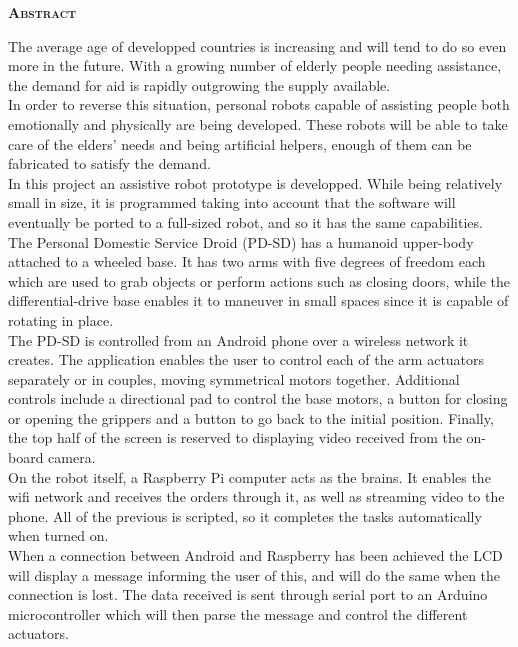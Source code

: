 
\vspace*{2cm}
\begin{center}
\color{part} \textsc{\huge \textbf{Abstract}}\\[1cm]
\end{center}

The average age of developped countries is increasing and will tend to do so even more in the future. With a growing number of elderly people needing assistance, the demand for aid is rapidly outgrowing the supply available.\\

In order to reverse this situation, personal robots capable of assisting people both emotionally and physically are being developed. These robots will be able to take care of the elders' needs and being artificial helpers, enough of them can be fabricated to satisfy the demand.\\

In this project an assistive robot prototype is developped. While being relatively small in size, it is programmed taking into account that the software will eventually be ported to a full-sized robot, and so it has the same capabilities.\\

The Personal Domestic Service Droid (PD-SD) has a humanoid upper-body attached to a wheeled base. It has two arms with five degrees of freedom each which are used to grab objects or perform actions such as closing doors, while the differential-drive base enables it to maneuver in small spaces since it is capable of rotating in place.\\

The PD-SD is controlled from an Android phone over a wireless network it creates. The application enables the user to control each of the arm actuators separately or in couples, moving symmetrical motors together. Additional controls include a directional pad to control the base motors, a button for closing or opening the grippers and a button to go back to the initial position. Finally, the top half of the screen is reserved to displaying video received from the on-board camera.\\

On the robot itself, a Raspberry Pi computer acts as the brains. It enables the wifi network and receives the orders through it, as well as streaming video to the phone. All of the previous is scripted, so it completes the tasks automatically when turned on.\\

When a connection between Android and Raspberry has been achieved the LCD will display a message informing the user of this, and will do the same when the connection is lost. The data received is sent through serial port to an Arduino microcontroller which will then parse the message and control the different actuators. 